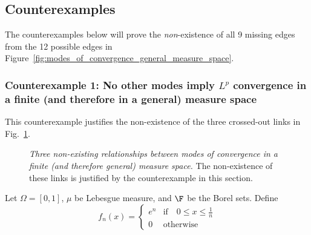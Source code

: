 \documentclass{article} %
\begin{document}
\subsection{Counterexamples}

The counterexamples below will prove the \textit{non}-existence of all 9 missing edges from the 12 possible edges in Figure~\ref{fig:modes_of_convergence_general_measure_space}.

\subsubsection{Counterexample 1: No other modes imply $L^p$ convergence in a finite (and therefore in a general) measure space}

This counterexample justifies the non-existence of the three crossed-out links in Fig.~\ref{fig:non_existing_relationships_between_modes_of_convergence_in_a_finite_space}. 

\begin{figure}[H]
\centering	
{}
\caption{ \textit{Three non-existing relationships between modes of convergence in a finite (and therefore general) measure space.}  The non-existence of these links is justified by the counterexample in this section.}
\label{fig:non_existing_relationships_between_modes_of_convergence_in_a_finite_space}
\end{figure}


Let $\Omega=[0,1]$, $\mu$ be Lebesgue measure, and $\F$ be the Borel sets.  Define
\[f_n(x) =
\begin{cases}
e^n & \text{if} \quad 0 \leq x \leq \frac{1}{n} \\
0 & \text{otherwise}	
\end{cases}
 \]
 
\end{document}
